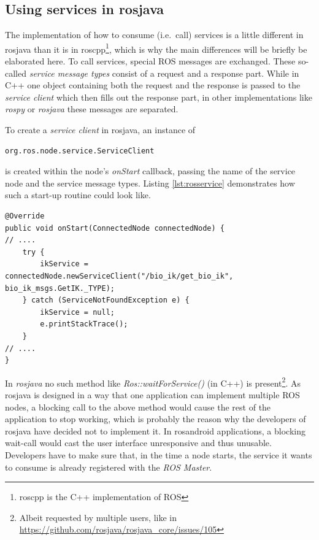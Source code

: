 \subsection{Using services in rosjava}
\label{sec:using_services}
The implementation of how to consume (i.e.~call) services is a little different in rosjava than it is in roscpp\footnote{roscpp is the C++ implementation of ROS}, which is why the main differences will be briefly be elaborated here. To call services, special ROS messages are exchanged. These so-called \textit{service message types} consist of a request and a response part. While in C++ one object containing both the request and the response is passed to the \textit{service client} which then fills out the response part\cite{ros:serviceclient}, in other implementations like \textit{rospy} or \textit{rosjava} these messages are separated.

To create a \textit{service client} in rosjava, an instance of 

\begin{lstlisting}[numbers=none]
org.ros.node.service.ServiceClient
\end{lstlisting}

is created within the node's \textit{onStart} callback, passing the name of the service node and the service message types. Listing \ref{lst:rosservice} demonstrates how such a start-up routine could look like.

\begin{lstlisting}[caption={Example on how to connect to a ROS service in rosjava},label=lst:rosservice]
@Override
public void onStart(ConnectedNode connectedNode) {
// ....
	try {
		ikService = connectedNode.newServiceClient("/bio_ik/get_bio_ik", bio_ik_msgs.GetIK._TYPE);
	} catch (ServiceNotFoundException e) {
		ikService = null;
		e.printStackTrace();
	}	
// ....
}
\end{lstlisting}

In \textit{rosjava} no such method like \textit{Ros::waitForService()} (in C++) is present\footnote{Albeit requested by multiple users, like in \url{https://github.com/rosjava/rosjava_core/issues/105}}. As rosjava is designed in a way that one application can implement multiple ROS nodes, a blocking call to the above method would cause the rest of the application to stop working, which is probably the reason why the developers of rosjava have decided not to implement it. In rosandroid applications, a blocking wait-call would cast the user interface unresponsive and thus unusable. Developers have to make sure that, in the time a node starts, the service it wants to consume is already registered with the \textit{ROS Master}.

